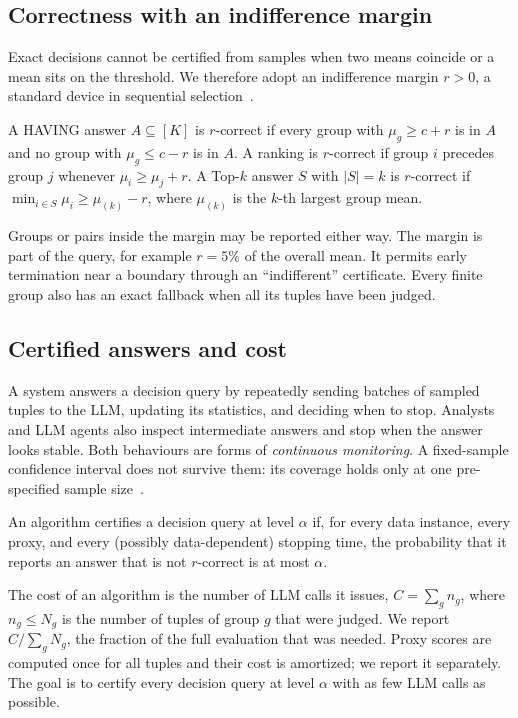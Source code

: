 \subsection{Correctness with an indifference margin}

Exact decisions cannot be certified from samples when two means coincide or a mean sits on the threshold.
We therefore adopt an indifference margin $r>0$, a standard device in sequential selection~\cite{bechhofer1954,lucb}.

\begin{definition}
\label{def:rcorrect}
A HAVING answer $A\subseteq[K]$ is $r$-correct if every group with $\mu_g\ge c+r$ is in $A$ and no group with $\mu_g\le c-r$ is in $A$.
A ranking is $r$-correct if group $i$ precedes group $j$ whenever $\mu_i\ge \mu_j+r$.
A Top-$k$ answer $S$ with $|S|=k$ is $r$-correct if $\min_{i\in S}\mu_i\ge \mu_{(k)}-r$, where $\mu_{(k)}$ is the $k$-th largest group mean.
\end{definition}

Groups or pairs inside the margin may be reported either way.
The margin is part of the query, for example $r=5\%$ of the overall mean.
It permits early termination near a boundary through an ``indifferent'' certificate. Every finite group also has an exact fallback when all its tuples have been judged.

\subsection{Certified answers and cost}

A system answers a decision query by repeatedly sending batches of sampled tuples to the LLM, updating its statistics, and deciding when to stop.
Analysts and LLM agents also inspect intermediate answers and stop when the answer looks stable.
Both behaviours are forms of \emph{continuous monitoring}.
A fixed-sample confidence interval does not survive them: its coverage holds only at one pre-specified sample size~\cite{ramdas2023savi,johari2022}.

\begin{definition}
\label{def:certified}
An algorithm certifies a decision query at level $\alpha$ if, for every data instance, every proxy, and every (possibly data-dependent) stopping time, the probability that it reports an answer that is not $r$-correct is at most $\alpha$.
\end{definition}

The cost of an algorithm is the number of LLM calls it issues, $C=\sum_g n_g$, where $n_g\le N_g$ is the number of tuples of group $g$ that were judged.
We report $C/\sum_g N_g$, the fraction of the full evaluation that was needed.
Proxy scores are computed once for all tuples and their cost is amortized; we report it separately.
The goal is to certify every decision query at level $\alpha$ with as few LLM calls as possible.
